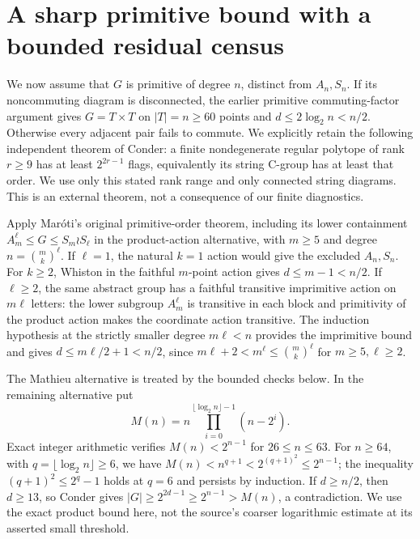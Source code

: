 \section{A sharp primitive bound with a bounded residual census}
We now assume that $G$ is primitive of degree $n$, distinct from $A_n,S_n$.
If its noncommuting diagram is disconnected, the earlier primitive
commuting-factor argument gives $G=T\times T$ on $|T|=n\geq60$ points
and $d\leq2\log_2n<n/2$. Otherwise every adjacent pair fails to commute.
We explicitly retain the following independent theorem of Conder:
a finite nondegenerate regular polytope of rank $r\geq9$ has at least
$2^{2r-1}$ flags, equivalently its string C-group has at least that order.
We use only this stated rank range and only connected string diagrams.
This is an external theorem, not a consequence of our finite diagnostics.

Apply Mar\'oti's original primitive-order theorem, including its lower
containment $A_m^\ell\leq G\leq S_m\wr S_\ell$ in the product-action
alternative, with $m\geq5$ and degree $n=\binom m k^\ell$.
If $\ell=1$, the natural $k=1$ action would give the excluded $A_n,S_n$.
For $k\geq2$, Whiston in the faithful $m$-point action gives
$d\leq m-1<n/2$. If $\ell\geq2$, the same abstract group has a faithful
transitive imprimitive action on $m\ell$ letters: the lower subgroup
$A_m^\ell$ is transitive in each block and primitivity of the product
action makes the coordinate action transitive. The induction hypothesis at the strictly smaller degree $m\ell<n$
provides the imprimitive bound and gives $d\leq m\ell/2+1<n/2$, since
$m\ell+2<m^\ell\leq\binom m k^\ell$ for $m\geq5,\ell\geq2$.

The Mathieu alternative is treated by the bounded checks below.
In the remaining alternative put
\[
 M(n)=n\prod_{i=0}^{\lfloor\log_2n\rfloor-1}(n-2^i).
\]
Exact integer arithmetic verifies $M(n)<2^{n-1}$ for $26\leq n\leq63$.
For $n\geq64$, with $q=\lfloor\log_2n\rfloor\geq6$, we have
$M(n)<n^{q+1}<2^{(q+1)^2}\leq2^{n-1}$; the inequality
$(q+1)^2\leq2^q-1$ holds at $q=6$ and persists by induction.
If $d\geq n/2$, then $d\geq13$, so Conder gives
$|G|\geq2^{2d-1}\geq2^{n-1}>M(n)$, a contradiction.
We use the exact product bound here, not the source's coarser logarithmic
estimate at its asserted small threshold.

